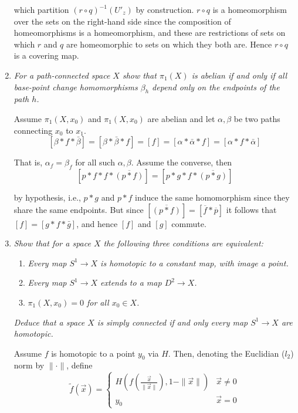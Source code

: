 \documentclass[10pt]{article}
\begin{document}
\begin{enumerate}
which partition $(r \circ q)^{-1} \left( U'_z \right)$ by construction.  $r \circ q$ is a homeomorphism over the sets on the right-hand side since the composition of homeomorphisms is a homeomorphism, and these are restrictions of sets on which $r$ and $q$ are homeomorphic to sets on which they both are.  Hence $r \circ q$ is a covering map.

\item \emph{For a path-connected space $X$ show that $\pi_1(X)$ is abelian if and only if all base-point change homomorphisms $\beta_h$ depend only on the endpoints of the path $h$.}

Assume $\pi_1(X,x_0)$ and $\pi_1(X,x_0)$ are abelian and let $\alpha, \beta$ be two paths connecting $x_0$ to $x_1$.
\[
[\beta \ast f \ast \bar{\beta}] = [\beta \ast \bar{\beta} \ast f] = [f] = [\alpha \ast \bar{\alpha} \ast f] = [\alpha \ast f \ast \bar{\alpha}]
\]

That is, $\alpha_f = \beta_f$ for all such $\alpha, \beta$.  Assume the converse, then
\[
[p \ast f \ast f \ast \overline{(p \ast f)}] = [p \ast g \ast f \ast \overline{(p \ast g)}]
\]

by hypothesis, i.e., $p \ast g$ and $p \ast f$ induce the same homomorphism since they share the same endpoints.  But since $[\overline{(p \ast f)}] = [\overline{f} \ast \overline{p}]$ it follows that $[f] = [g \ast f \ast \bar{g}]$, and hence $[f]$ and $[g]$ commute.

\item \emph{Show that for a space $X$ the following three conditions are equivalent:}
\begin{enumerate}
\item \emph{Every map $S^1 \rightarrow X$ is homotopic to a constant map, with image a point.}
\item \emph{Every map $S^1 \rightarrow X$ extends to a map $D^2 \rightarrow X$.}
\item \emph{$\pi_1(X,x_0) = 0$ for all $x_0 \in X$.}
\end{enumerate}
\emph{Deduce that a space $X$ is simply connected if and only every map $S^1 \rightarrow X$ are homotopic.}

Assume $f$ is homotopic to a point $y_0$ via $H$.  Then, denoting the Euclidian ($l_2$) norm by $\| \cdot \|$, define
\[
\tilde{f}(\vec{x}) = \begin{cases} H\left(f\left(\frac{\vec{x}}{\|\vec{x}\|}\right), 1 - \|\vec{x}\|\right) & \vec{x} \neq 0 \\ y_0 & \vec{x} = 0 \end{cases}
\]


\end{enumerate}
\end{document}
